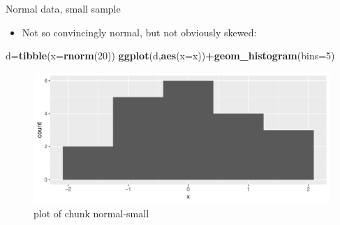 \documentclass[
  ignorenonframetext,
]{beamer}
\newenvironment{Shaded}{\begin{snugshade}}{\end{snugshade}}
\newcommand{\DataTypeTok}[1]{\textcolor[rgb]{0.13,0.29,0.53}{#1}}
\newcommand{\DecValTok}[1]{\textcolor[rgb]{0.00,0.00,0.81}{#1}}
\newcommand{\KeywordTok}[1]{\textcolor[rgb]{0.13,0.29,0.53}{\textbf{#1}}}
\newcommand{\NormalTok}[1]{#1}
\newcommand{\OperatorTok}[1]{\textcolor[rgb]{0.81,0.36,0.00}{\textbf{#1}}}
\providecommand{\tightlist}{%
  \setlength{\itemsep}{0pt}\setlength{\parskip}{0pt}}
\begin{document}
\begin{frame}[fragile]{Normal data, small sample}
\protect\hypertarget{normal-data-small-sample}{}

\begin{itemize}
\tightlist
\item
  Not so convincingly normal, but not obviously skewed:
\end{itemize}

\begin{Shaded}
\begin{Highlighting}[]
\NormalTok{d=}\KeywordTok{tibble}\NormalTok{(}\DataTypeTok{x=}\KeywordTok{rnorm}\NormalTok{(}\DecValTok{20}\NormalTok{))}
\KeywordTok{ggplot}\NormalTok{(d,}\KeywordTok{aes}\NormalTok{(}\DataTypeTok{x=}\NormalTok{x))}\OperatorTok{+}\KeywordTok{geom_histogram}\NormalTok{(}\DataTypeTok{bins=}\DecValTok{5}\NormalTok{)}
\end{Highlighting}
\end{Shaded}

\begin{figure}
\centering
\includegraphics{figure/normal-small-1.pdf}
\caption{plot of chunk normal-small}
\end{figure}

\end{frame}
\end{document}

